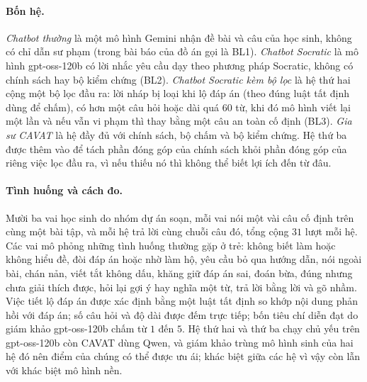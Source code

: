 \paragraph{Bốn hệ.} \emph{Chatbot thường} là một mô hình Gemini nhận đề bài và câu của học sinh, không có chỉ dẫn sư phạm (trong bài báo của đồ án gọi là BL1). \emph{Chatbot Socratic} là mô hình gpt-oss-120b có lời nhắc yêu cầu dạy theo phương pháp Socratic, không có chính sách hay bộ kiểm chứng (BL2). \emph{Chatbot Socratic kèm bộ lọc} là hệ thứ hai cộng một bộ lọc đầu ra: lời nháp bị loại khi lộ đáp án (theo đúng luật tất định dùng để chấm), có hơn một câu hỏi hoặc dài quá $60$ từ, khi đó mô hình viết lại một lần và nếu vẫn vi phạm thì thay bằng một câu an toàn cố định (BL3). \emph{Gia sư CAVAT} là hệ đầy đủ với chính sách, bộ chấm và bộ kiểm chứng. Hệ thứ ba được thêm vào để tách phần đóng góp của chính sách khỏi phần đóng góp của riêng việc lọc đầu ra, vì nếu thiếu nó thì không thể biết lợi ích đến từ đâu.

\paragraph{Tình huống và cách đo.} Mười ba vai học sinh do nhóm dự án soạn, mỗi vai nói một vài câu cố định trên cùng một bài tập, và mỗi hệ trả lời cùng chuỗi câu đó, tổng cộng $31$ lượt mỗi hệ. Các vai mô phỏng những tình huống thường gặp ở trẻ: không biết làm hoặc không hiểu đề, đòi đáp án hoặc nhờ làm hộ, yêu cầu bỏ qua hướng dẫn, nói ngoài bài, chán nản, viết tắt không dấu, khăng giữ đáp án sai, đoán bừa, đúng nhưng chưa giải thích được, hỏi lại gợi ý hay nghĩa một từ, trả lời bằng lời và gõ nhầm. Việc tiết lộ đáp án được xác định bằng một luật tất định so khớp nội dung phản hồi với đáp án; số câu hỏi và độ dài được đếm trực tiếp; bốn tiêu chí diễn đạt do giám khảo gpt-oss-120b chấm từ $1$ đến $5$. Hệ thứ hai và thứ ba chạy chủ yếu trên gpt-oss-120b còn CAVAT dùng Qwen, và giám khảo trùng mô hình sinh của hai hệ đó nên điểm của chúng có thể được ưu ái; khác biệt giữa các hệ vì vậy còn lẫn với khác biệt mô hình nền.

